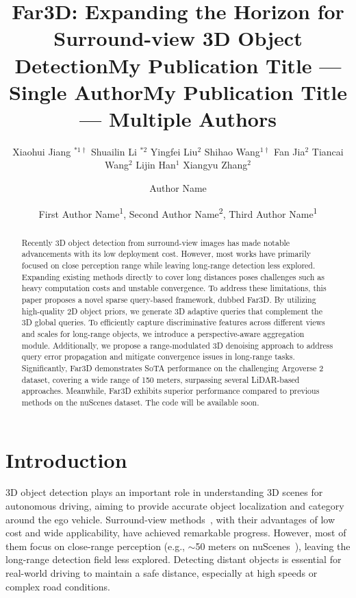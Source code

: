 \documentclass[letterpaper]{article} \usepackage{aaai24}
\title{Far3D: Expanding the Horizon for Surround-view 3D Object Detection}
\author{
Xiaohui Jiang $^{*1\dagger}$ \hspace{0.25cm} Shuailin Li $^{*2}$ \hspace{0.25cm} Yingfei Liu$^2$ \hspace{0.25cm} Shihao Wang$^{1\dagger}$ \hspace{0.25cm} Fan Jia$^2$ \hspace{0.25cm} Tiancai Wang$^2$ \hspace{0.25cm} Lijin Han$^{1}$  \hspace{0.25cm}  Xiangyu Zhang$^2$ \\ }
\title{My Publication Title --- Single Author}
\author {
    Author Name
}
\title{My Publication Title --- Multiple Authors}
\author {
First Author Name\textsuperscript{\rm 1},
    Second Author Name\textsuperscript{\rm 2},
    Third Author Name\textsuperscript{\rm 1}
}
\newcommand{\far}{Far3D}
\begin{document}
\maketitle
\let\thefootnote\relax{} 
\let\thefootnote\relax{} \begin{abstract}
Recently 3D object detection from surround-view images has made notable advancements with its low deployment cost. However, most works have primarily focused on close perception range while leaving long-range detection less explored.
Expanding existing methods directly to cover long distances poses challenges such as heavy computation costs and unstable convergence. 
To address these limitations, this paper proposes a novel sparse query-based framework, dubbed \far{}. By utilizing high-quality 2D object priors, we generate 3D adaptive queries that complement the 3D global queries.
To efficiently capture discriminative features across different views and scales for long-range objects, we introduce a perspective-aware aggregation module. Additionally, we propose a range-modulated 3D denoising approach to address query error propagation and mitigate convergence issues in long-range tasks.
Significantly, \far{} demonstrates SoTA performance on the challenging Argoverse 2 dataset, covering a wide range of 150 meters, surpassing several LiDAR-based approaches. Meanwhile, \far{} exhibits superior performance compared to previous methods on the nuScenes dataset.
The code will be available soon.






\end{abstract}  \section{Introduction}

3D object detection plays an important role in understanding 3D scenes for autonomous driving, aiming to provide accurate object localization and category around the ego vehicle. Surround-view methods~\cite{huang2022bevdet4d, li2023bevdepth, liu2022petrv2,  li2022bevformer, yang2023bevformer, park2022time, wang2023exploring}, 
with their advantages of low cost and wide applicability, have achieved remarkable progress. 
However, most of them focus on close-range perception (e.g., $\sim$50 meters on nuScenes~\cite{caesar2020nuscenes}), leaving the long-range detection field less explored. Detecting distant objects is essential for real-world driving to maintain a safe distance, especially at high speeds or complex road conditions.
\end{document}
